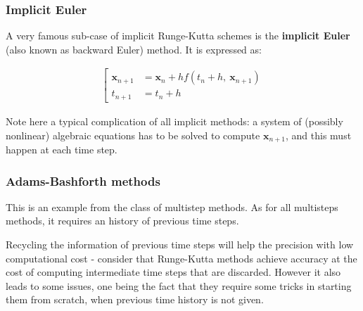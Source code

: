 \documentclass{digitaldynamics}
\def\vect#1{\bm{#1}}
\begin{document}
\subsubsection{Implicit Euler}

A very famous sub-case of implicit Runge-Kutta schemes is the \textbf{implicit Euler} (also known as backward Euler) method.
It is expressed as:
\begin{fleqn}
\begin{align}
\left[
\begin{aligned}
\vect{x}_{n + 1} &= \vect{x}_n + h f(t_n + h,\ \vect{x}_{n + 1}) \\
t_{n+1} &= t_n + h 
\end{aligned}
\right.
\end{align}
\end{fleqn}

Note here a typical complication of all implicit methods: a system of (possibly nonlinear) algebraic equations has 
to be solved to compute $\vect{x}_{n + 1}$, and this must happen at each time step.



\subsubsection{Adams-Bashforth methods}

This is an example from the class of multistep methods. As for all multisteps methods, it requires an history of previous time steps. 

Recycling the information of previous time steps will help the precision with low computational cost - consider that Runge-Kutta methods achieve accuracy at the cost of computing intermediate time steps that are discarded. However it also leads to some issues, one being the fact that they require some tricks in starting them from scratch, when previous time history is not given.
\end{document}

